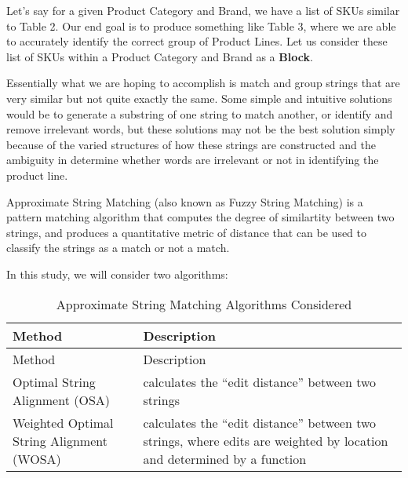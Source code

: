 \documentclass[]{article}
\begin{document}
Let's say for a given Product Category and Brand, we have a list of SKUs
similar to Table 2. Our end goal is to produce something like Table 3,
where we are able to accurately identify the correct group of Product
Lines. Let us consider these list of SKUs within a Product Category and
Brand as a \textbf{Block}.

Essentially what we are hoping to accomplish is match and group strings
that are very similar but not quite exactly the same. Some simple and
intuitive solutions would be to generate a substring of one string to
match another, or identify and remove irrelevant words, but these
solutions may not be the best solution simply because of the varied
structures of how these strings are constructed and the ambiguity in
determine whether words are irrelevant or not in identifying the product
line.

Approximate String Matching (also known as Fuzzy String Matching) is a
pattern matching algorithm that computes the degree of similartity
between two strings, and produces a quantitative metric of distance that
can be used to classify the strings as a match or not a match.

In this study, we will consider two algorithms:

\begin{longtable}[]{@{}ll@{}}
\caption{Approximate String Matching Algorithms
Considered}\tabularnewline
\toprule
\begin{minipage}[b]{0.32\columnwidth}\raggedright\strut
Method\strut
\end{minipage} & \begin{minipage}[b]{0.62\columnwidth}\raggedright\strut
Description\strut
\end{minipage}\tabularnewline
\midrule
\endfirsthead
\toprule
\begin{minipage}[b]{0.32\columnwidth}\raggedright\strut
Method\strut
\end{minipage} & \begin{minipage}[b]{0.62\columnwidth}\raggedright\strut
Description\strut
\end{minipage}\tabularnewline
\midrule
\endhead
\begin{minipage}[t]{0.32\columnwidth}\raggedright\strut
Optimal String Alignment (OSA)\strut
\end{minipage} & \begin{minipage}[t]{0.62\columnwidth}\raggedright\strut
calculates the ``edit distance'' between two strings\strut
\end{minipage}\tabularnewline
\begin{minipage}[t]{0.32\columnwidth}\raggedright\strut
Weighted Optimal String Alignment (WOSA)\strut
\end{minipage} & \begin{minipage}[t]{0.62\columnwidth}\raggedright\strut
calculates the ``edit distance'' between two strings, where edits are
weighted by location and determined by a function\strut
\end{minipage}\tabularnewline
\bottomrule
\end{longtable}
\end{document}
